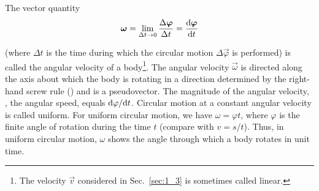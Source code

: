 The vector quantity
\begin{equation}\label{eq:1_93}
\boldsymbol{\omega} = \lim_{\Delta t\to 0} \frac{\Delta\boldsymbol{\varphi}}{\Delta t} = \frac{\mathrm{d}\boldsymbol{\varphi}}{\mathrm{d} t}
\end{equation}

\noindent
(where $\Delta t$ is the time during which the circular motion $\Delta\vec{\varphi}$ is performed) is called the angular velocity of a body\footnote{The velocity $\vec{v}$ considered in Sec.~\ref{sec:1_3} is sometimes called linear.}. The angular velocity $\vec{\omega}$ is directed along the axis about which the body is rotating in a direction determined by the right-hand screw rule () and is a pseudovector. The magnitude of the angular velocity, \ie, the angular speed, equals $\mathrm{d}\varphi/\mathrm{d} t$. Circular motion at a constant angular velocity is called uniform. For uniform circular motion, we have $\omega=\varphi t$, where $\varphi$ is the finite angle of rotation during the time $t$ (compare with $v=s/t$). Thus, in uniform circular motion, $\omega$ shows the angle through which a body rotates in unit time.

